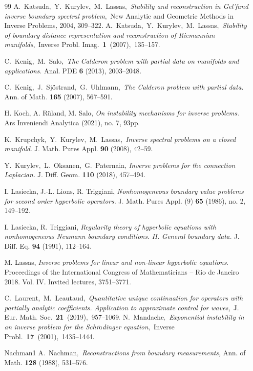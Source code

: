 \documentclass[11pt,letterpaper]{amsart}
\numberwithin{equation}{section}
\theoremstyle{definition}
\theoremstyle{plain}
\theoremstyle{definition}
\theoremstyle{plain}
\theoremstyle{definition}
\theoremstyle{plain}
\begin{document}
\begin{thebibliography}{99}
 A.~Katsuda,~Y.~Kurylev,~M.~Lassas,~\emph{Stability and reconstruction in Gel'fand inverse boundary spectral problem},~New Analytic and Geometric Methods in Inverse Problems, 2004, 309--322.
 A.~Katsuda,~Y.~Kurylev,~M.~Lassas,~\emph{Stability of boundary distance representation and reconstruction of Riemannian manifolds},~Inverse Probl. Imag.~\textbf{1}~(2007),~135--157.


C.~Kenig,~M.~Salo,~\emph{The Calderon problem with partial data on manifolds and applications.} Anal. PDE \textbf{6} (2013), 2003--2048. 

C.~Kenig,~J.~Sj\"ostrand,~G.~Uhlmann,~\emph{The Calderon problem with partial data.} Ann. of Math. \textbf{165} (2007),  567--591.

H. Koch, A. R\"uland, M. Salo, \emph{On instability mechanisms for inverse problems.}
Ars Inveniendi Analytica (2021), no. 7, 93pp.

K.~Krupchyk,~Y.~Kurylev,~M.~Lassas,~\emph{Inverse spectral problems on a closed manifold}. J. Math. Pures Appl. {\bf 90} (2008), 42--59.

 Y.~Kurylev,~L.~Oksanen,~G.~Paternain, \emph{Inverse problems for the connection Laplacian.} {J. Diff. Geom.} {\bf 110} (2018), 457--494.

I. Lasiecka, J.-L. Lions, R. Triggiani, \emph{Nonhomogeneous boundary value problems for second order hyperbolic
operators.}
{J. Math. Pures Appl.} (9) {\bf 65} (1986), no. 2, 149--192.

I. Lasiecka, R. Triggiani, \emph{Regularity theory of hyperbolic equations with nonhomogeneous Neumann boundary conditions. II. General boundary data.} J. Diff. Eq. {\bf 94} (1991), 112--164. 


 M. Lassas, \emph{Inverse problems for linear and non-linear hyperbolic equations.} Proceedings of the International Congress of Mathematicians -- Rio de Janeiro 2018. Vol. IV. Invited lectures, 3751--3771.

 C.~Laurent,~M.~Leautaud,~\emph{Quantitative unique continuation for operators with partially analytic coefficients. Application to approximate control for waves},~J. Eur. Math. Soc.~\textbf{21}~(2019),~957--1069.
 N.~Mandache,~\emph{Exponential instability in an inverse problem for the Schr$\ddot{\textrm{o}}$dinger equation},~Inverse Probl.~\textbf{17}~(2001),~1435--1444.


\bibitem
{Nachman1}
A.~Nachman,~\emph{Reconstructions from boundary measurements,}
Ann. of
Math. {\bf 128} (1988), 531--576.




\end{thebibliography}
\end{document}
